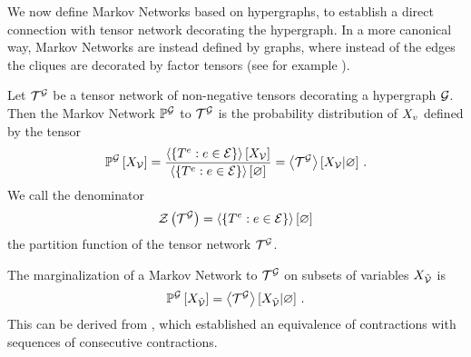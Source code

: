 
We now define Markov Networks based on hypergraphs, to establish a direct connection with tensor network decorating the hypergraph.
In a more canonical way, Markov Networks are instead defined by graphs, where instead of the edges the cliques are decorated by factor tensors (see for example \cite{koller_probabilistic_2009}).

\begin{definition}
    \label{def:markovNetwork}
    Let $\mathcal{T}^{\mathcal{G}}$ be a tensor network of non-negative tensors decorating a hypergraph $\mathcal{G}$.
    Then the Markov Network $\mathbb{P}^{\mathcal{G}}$ to $\mathcal{T}^{\mathcal{G}}$ is the probability distribution of $X_{v}$ defined by the tensor
    \begin{align*}
        \mathbb{P}^{\mathcal{G}}\left[X_{\mathcal{V}}\right] = \frac{
            \left\langle \{T^{e} : e \in \mathcal{E}\}\right\rangle \left[ X_{\mathcal{V}} \right]
        }{
            \left\langle \{T^{e} : e \in \mathcal{E}\}\right\rangle \left[ \varnothing \right]
        } = \left\langle \mathcal{T}^{\mathcal{G}}\right\rangle \left[ X_{\mathcal{V}} | \varnothing \right] \, .
    \end{align*}
    We call the denominator
    \begin{align*}
        \mathcal{Z}\left(\mathcal{T}^{\mathcal{G}}\right) = \left\langle \{T^{e} : e \in \mathcal{E}\}\right\rangle \left[ \varnothing \right]
    \end{align*}
    the partition function of the tensor network $\mathcal{T}^{\mathcal{G}}$.
\end{definition}

The marginalization of a Markov Network to $\mathcal{T}^{\mathcal{G}}$ on subsets of variables $X_{\tilde{\mathcal{V}}}$ is
\begin{align*}
    \mathbb{P}^{\mathcal{G}}\left[X_{\tilde{\mathcal{V}}}\right]
    = \left\langle \mathcal{T}^{\mathcal{G}}\right\rangle \left[ X_{\tilde{\mathcal{V}}} | \varnothing \right] \, .
\end{align*}
This can be derived from , which established an equivalence of contractions with sequences of consecutive contractions.

